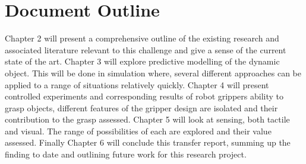 \section{Document Outline}
Chapter 2 will present a comprehensive outline of the existing research and associated literature relevant to this challenge and give a sense of the current state of the art. Chapter 3 will explore predictive modelling of the dynamic object. This will be done in simulation where, several different approaches can be applied to a range of situations relatively quickly. Chapter 4 will present controlled experiments and corresponding results of robot grippers ability to grasp objects, different features of the gripper design are isolated and their contribution to the grasp assessed. Chapter 5 will look at sensing, both tactile and visual. The range of possibilities of each are explored and their value assessed. Finally Chapter 6 will conclude this transfer report, summing up the finding to date and outlining future work for this research project.



